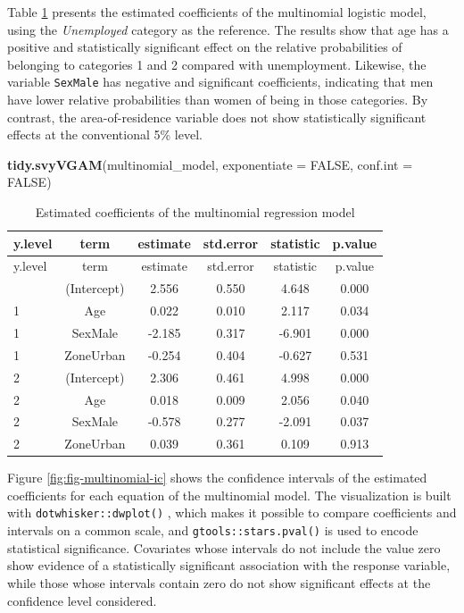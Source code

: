 \documentclass[
  english,
  12pt,
]{book}
\newenvironment{Shaded}{\begin{snugshade}}{\end{snugshade}}
\newcommand{\AttributeTok}[1]{\textcolor[rgb]{0.13,0.29,0.53}{#1}}
\newcommand{\ConstantTok}[1]{\textcolor[rgb]{0.56,0.35,0.01}{#1}}
\newcommand{\FunctionTok}[1]{\textcolor[rgb]{0.13,0.29,0.53}{\textbf{#1}}}
\newcommand{\NormalTok}[1]{#1}
\begin{document}
Table \ref{tab:tab-multinomial-coef} presents the estimated coefficients of the multinomial logistic model, using the \emph{Unemployed} category as the reference. The results show that age has a positive and statistically significant effect on the relative probabilities of belonging to categories 1 and 2 compared with unemployment. Likewise, the variable \texttt{SexMale} has negative and significant coefficients, indicating that men have lower relative probabilities than women of being in those categories. By contrast, the area-of-residence variable does not show statistically significant effects at the conventional 5\% level.

\begin{Shaded}
\begin{Highlighting}[]
\FunctionTok{tidy.svyVGAM}\NormalTok{(multinomial\_model, }\AttributeTok{exponentiate =} \ConstantTok{FALSE}\NormalTok{, }\AttributeTok{conf.int =} \ConstantTok{FALSE}\NormalTok{)}
\end{Highlighting}
\end{Shaded}

\begin{longtable}[]{@{}lccccc@{}}
\caption{\label{tab:tab-multinomial-coef}Estimated coefficients of the multinomial regression model}\tabularnewline
\toprule\noalign{}
y.level & term & estimate & std.error & statistic & p.value \\
\midrule\noalign{}
\endfirsthead
\toprule\noalign{}
y.level & term & estimate & std.error & statistic & p.value \\
\midrule\noalign{}
\endhead
\bottomrule\noalign{}
\endlastfoot
1 & (Intercept) & 2.556 & 0.550 & 4.648 & 0.000 \\
1 & Age & 0.022 & 0.010 & 2.117 & 0.034 \\
1 & SexMale & -2.185 & 0.317 & -6.901 & 0.000 \\
1 & ZoneUrban & -0.254 & 0.404 & -0.627 & 0.531 \\
2 & (Intercept) & 2.306 & 0.461 & 4.998 & 0.000 \\
2 & Age & 0.018 & 0.009 & 2.056 & 0.040 \\
2 & SexMale & -0.578 & 0.277 & -2.091 & 0.037 \\
2 & ZoneUrban & 0.039 & 0.361 & 0.109 & 0.913 \\
\end{longtable}

Figure \ref{fig:fig-multinomial-ic} shows the confidence intervals of the estimated coefficients for each equation of the multinomial model. The visualization is built with \texttt{dotwhisker::dwplot()} \citep{dotwhisker2025}, which makes it possible to compare coefficients and intervals on a common scale, and \texttt{gtools::stars.pval()} \citep{gtools2025} is used to encode statistical significance. Covariates whose intervals do not include the value zero show evidence of a statistically significant association with the response variable, while those whose intervals contain zero do not show significant effects at the confidence level considered.
\end{document}
